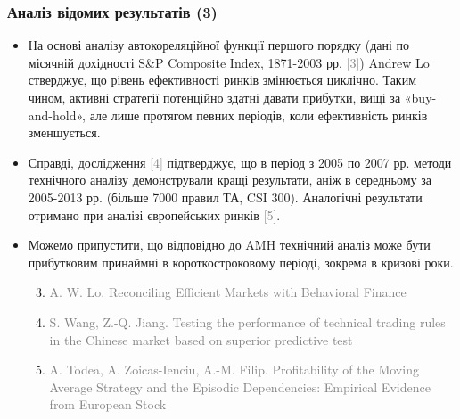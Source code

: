 \documentclass[aspectratio=169]{beamer}
\begin{document}
\begin{frame}
\frametitle{Аналіз відомих результатів (3)}
\begin{itemize}
\item На основі аналізу автокореляційної функції першого порядку (дані по місячній дохідності S&P Composite Index, 1871-2003 рр. \textcolor{gray}{[3]}) Andrew Lo стверджує, що рівень ефективності ринків змінюється циклічно. Таким чином, активні стратегії потенційно здатні давати прибутки, вищі за «buy-and-hold», але лише протягом певних періодів, коли ефективність ринків зменшується. 
\tinyskip
\item Справді, дослідження \textcolor{gray}{[4]} підтверджує, що в період з 2005 по 2007 рр. методи технічного аналізу демонстрували кращі результати, аніж в середньому за 2005-2013 рр. (більше 7000 правил ТА, CSI 300). Аналогічні результати отримано при аналізі європейських ринків \textcolor{gray}{[5]}.
\tinyskip
\item Можемо припустити, що відповідно до AMH технічний аналіз може бути прибутковим принаймні в короткостроковому періоді, зокрема в кризові роки.
\tinyskip
\scriptsize 
\begin{enumerate}
\setcounter{enumi}{2}
\scriptsize \item \textcolor{gray}{A. W. Lo. Reconciling Efficient Markets with Behavioral Finance} 
\scriptsize \item \textcolor{gray}{S. Wang, Z.-Q. Jiang. Testing the performance of technical trading rules in the Chinese market based on superior predictive test}
\scriptsize \item \textcolor{gray}{ A. Todea, A. Zoicas-Ienciu, A.-M. Filip. Profitability of the Moving Average Strategy and the Episodic Dependencies: Empirical Evidence from European Stock}
\end{enumerate}
\end{itemize}
\end{frame}
\end{document}
